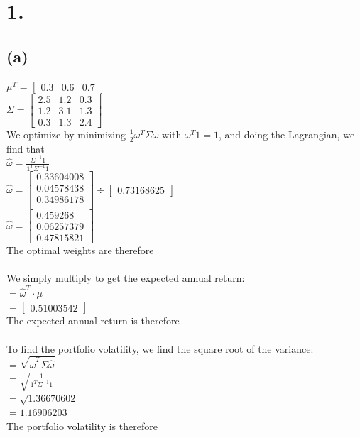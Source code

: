 \documentclass{article}
\begin{document}
\thispagestyle{firstpageheader}

\section*{1.}

{\Large 

\subsection*{(a)}

$\mu^T = 
\begin{bmatrix}
  0.3 & 0.6 & 0.7
\end{bmatrix}$ \\
$ \Sigma = 
\begin{bmatrix}
2.5 & 1.2 & 0.3 \\
1.2 & 3.1 & 1.3 \\
0.3 & 1.3 & 2.4
\end{bmatrix}$ \\ 

We optimize by minimizing $\frac{1}{2} \omega^T \Sigma \omega$ with $\omega^T 1 = 1$, and doing the Lagrangian, we find that \\
$\widehat{\omega} = \frac{\Sigma^{-1}1}{1^T\Sigma^{-1}1}$ \\
$\widehat{\omega} = 
\begin{bmatrix}
  0.33604008 \\ 
  0.04578438 \\ 
  0.34986178 \\ 
\end{bmatrix} 
\div
\begin{bmatrix}
  0.73168625
\end{bmatrix}$ \\
$\widehat{\omega} = 
\begin{bmatrix}
  0.459268 \\ 
  0.06257379 \\
  0.47815821
\end{bmatrix}$ \\
The optimal weights are therefore  \\ \\ 
We simply multiply to get the expected annual return: \\
$= \widehat{\omega}^T \cdot  \mu$ \\
$=
\begin{bmatrix}
  0.51003542
\end{bmatrix}$ \\
The expected annual return is therefore  \\ \\
To find the portfolio volatility, we find the square root of the variance: \\
$= \sqrt{\widehat{\omega}^T \Sigma \widehat{\omega}}$ \\
$= \sqrt{\frac{1}{1^T \Sigma^{-1} 1}}$ \\
$= \sqrt{1.36670602}$ \\
$= 1.16906203$ \\
The portfolio volatility is therefore 

}
\end{document}
